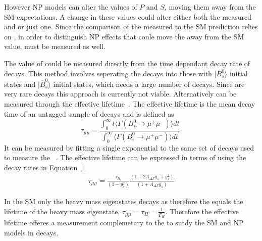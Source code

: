 However NP models can alter the values of $P$ and $S$, moving them away from the SM expectations. A change in these values could alter either both the measured \BF and \ADF or just one. Since the comparison of the measured \BF to the SM prediction relies on \ADG, in order to distinguish NP effects that coule move the \BF away from the SM value, \ADG must be measured as well. 

The value of \ADG could be measured directly from the time dependant decay rate of \bsmumu decays. This method involves seperating the \bsmumu decays into those with $| B^0_s \rangle$ initial states and $|\overline{B}^0_s\rangle$ initial states, which needs a large number of \bsmumu decays. Since \bsmumu are very rare decays this approach is currently not viable. Alternatively \ADG can be measured through the \bsmumu effective lifetime~\cite{}. The effective lifetime is the mean decay time of an untagged sample of \bsmumu decays and is defined as
\begin{equation}
  \tau_{\mu\mu} = \frac{\int^{\infty}_0 t\langle \Gamma (B^0_s \to \mu^+ \mu^-) \rangle dt}{\int^{\infty}_0 \langle \Gamma (B^0_s \to\mu^+ \mu^-) \rangle dt}.
\label{eq:EL_def}
\end{equation}
It can be measured by fitting a single exponential to the same set of decays used to measure the \BF~\cite{}. The effective lifetime can be expressed in terms of \ADG using the decay rates in Equation~\ref{}
\begin{align}
\tau_{\mu\mu} %
= \frac{\tau_{B_{s}}}{(1 - y_{s}^{2})} \frac{( 1 + 2A_{\Delta\Gamma}y_{s} + y_{s}^{2})}{(1 + A_{\Delta\Gamma}y_{s})}
\end{align}

In the SM only the heavy \bs mass eigenstates decays as \bsmumu therefore the \el equals the lifetime of the heavy mass eigenstate, $\tau_{\mu\mu} = \tau_H = \frac{1}{\Gamma_H}$. Therefore the effective lifetime offeres a measurement complemetary to the \BFs to sutdy the SM and NP models in \bsmumu decays.

